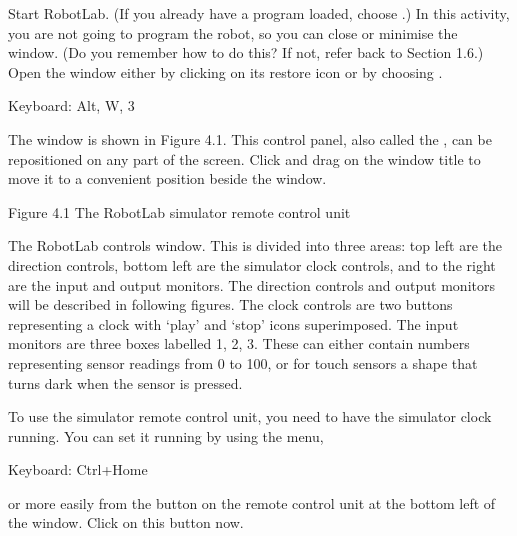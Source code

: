 \documentclass[letterpaper,10pt,english]{sphinxmanual}
\begin{document}
Start RobotLab. (If you already have a program loaded, choose .) In this activity, you are not going to program the robot, so you can close or minimise the  window. (Do you remember how to do this? If not, refer back to Section 1.6.) Open the  window either by clicking on its restore icon or by choosing .





Keyboard: Alt, W, 3





The  window is shown in Figure 4.1. This control panel, also called the , can be repositioned on any part of the screen. Click and drag on the  window title to move it to a convenient position beside the  window.


Figure 4.1 The RobotLab simulator remote control unit

The RobotLab controls window. This is divided into three areas: top left are the direction controls, bottom left are the simulator clock controls, and to the right are the input and output monitors. The direction controls and output monitors will be described in following figures. The clock controls are two buttons representing a clock with ‘play’ and ‘stop’ icons superimposed. The input monitors are three boxes labelled 1, 2, 3. These can either contain numbers representing sensor readings from
0 to 100, or for touch sensors a shape that turns dark when the sensor is pressed.

To use the simulator remote control unit, you need to have the simulator clock running. You can set it running by using the  menu,





Keyboard: Ctrl+Home





or more easily from the   button on the remote control unit at the bottom left of the  window. Click on this button now.
\end{document}
